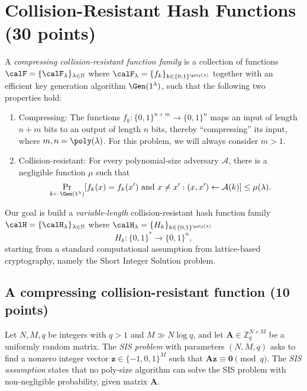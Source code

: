 \documentclass{article}
\begin{document}
\section{Collision-Resistant Hash Functions (30 points)}
A \emph{compressing collision-resistant function family} is a collection of functions $\calF = \{\calF_\lambda\}_{\lambda \in \mathbb{N}}$ where $\calF_\lambda = \{f_k\}_{k \in \{0,1\}^{\poly(\lambda)}}$ together with an efficient key generation algorithm $\Gen(1^\lambda)$, such that the following two properties hold:
\begin{enumerate}
    \item Compressing: The functions $f_{k}: \{0,1\}^{n+m} \to \{0,1\}^n$ maps an input of length $n+m$ bits to an output of length $n$ bits, thereby ``compressing'' its input, where $m, n = \poly(\lambda)$. For this problem, we will always consider $m > 1$.
    \item Collision-resistant: For every polynomial-size adversary $\mathcal{A}$, there is a negligible function $\mu$ such that
    \begin{align*}
        \Pr_{k \gets \Gen(1^\lambda)}[f_{k}(x) = f_k(x') \text{ and } x \neq x': (x, x') \gets \mathcal{A}(k) ] \le \mu(\lambda).
    \end{align*}
\end{enumerate}
Our goal is build a \textit{variable-length} collision-resistant hash function family $\calH = \{\calH_\lambda\}_{\lambda \in \mathbb{N}}$ where $\calH_\lambda = \{H_k\}_{k \in \{0,1\}^{\poly(\lambda)}}$
    \[ H_k : \{0,1\}^* \to \{0,1\}^n, \]
starting from a standard computational assumption from lattice-based cryptography, namely the Short Integer Solution problem.

\subsection{A compressing collision-resistant function (10 points)}
\begin{definition}
Let $N, M, q$ be integers with $q > 1$ and $M \gg N \log q$, and let $\mathbf{A} \in \mathbb{Z}_q^{N \times M}$ be a uniformly random matrix. The \emph{SIS problem} with parameters $(N, M, q)$ asks to find a nonzero integer vector $\mathbf{z} \in \{-1, 0, 1\}^M$ such that $\mathbf{A} \mathbf{z} \equiv \mathbf{0} \pmod{q}$. The \emph{SIS assumption} states that no poly-size algorithm can solve the SIS problem with non-negligible probability, given matrix $\mathbf{A}$.
\end{definition}
\end{document}
